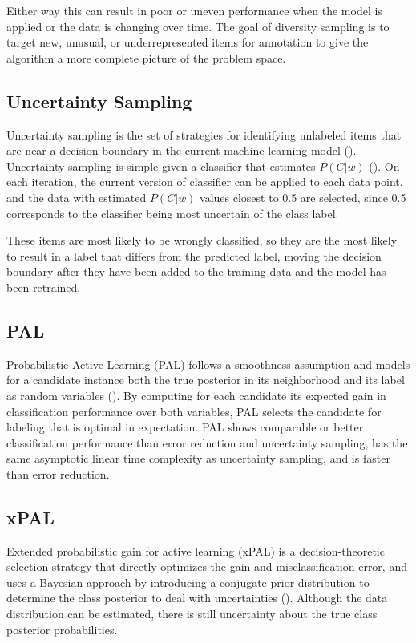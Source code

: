 Either way this can result in poor or uneven performance when the model is applied or the data is changing over time. The goal of diversity sampling is to target new, unusual, or underrepresented items for annotation to give the algorithm a more complete picture of the problem space. 

\subsection{Uncertainty Sampling}
Uncertainty sampling is the set of strategies for identifying unlabeled items that are near a decision boundary in the current machine learning model (\cite{munro2021human}). Uncertainty sampling is simple given a classifier that estimates $P (C|w)$ (\cite{lewis1994uncertainty}). On each iteration, the current version of classifier can be applied to each data point, and the data with estimated $P(C|w)$ values closest to 0.5 are selected, since 0.5 corresponds to the classifier being most uncertain of the class label.

These items are most likely to be wrongly classified, so they are the most likely to result in a label that differs from the predicted label, moving the decision boundary after they have been added to the training data and the model has been retrained.

\subsection{PAL}
Probabilistic Active Learning (PAL) follows a smoothness assumption and models for a candidate instance both the true posterior in its neighborhood and its label as random variables (\cite{kottke2014pal}). By computing for each candidate its expected gain in classification performance over both variables, PAL selects the candidate for labeling that is optimal in expectation. PAL shows comparable or better classification performance than error reduction and uncertainty sampling, has the same asymptotic linear time complexity as uncertainty sampling, and is faster than error reduction.

\subsection{xPAL}
Extended probabilistic gain for active learning (xPAL) is a decision-theoretic selection strategy that directly optimizes the gain and misclassification error, and uses a Bayesian approach by introducing a conjugate prior distribution to determine the class posterior to deal with uncertainties (\cite{kottke2021toward}). Although the data distribution can be estimated, there is still uncertainty about the true class posterior probabilities. 


